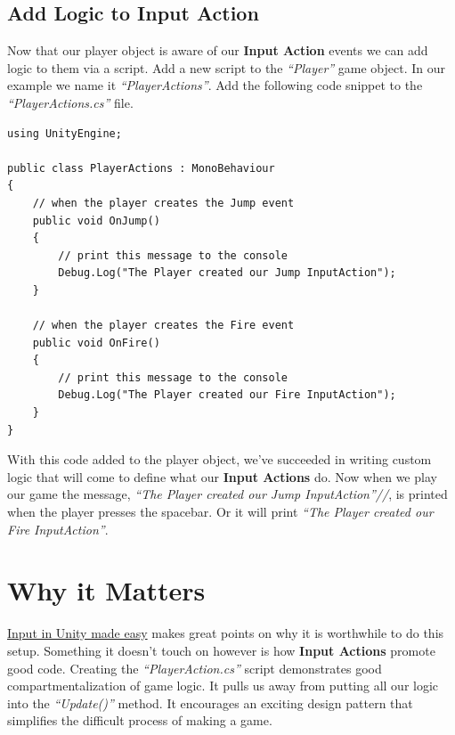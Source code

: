\documentclass[a4paper,11pt,twoside]{article}
\begin{document}
\subsection*{Add Logic to Input Action}
\label{sec:orgfc955dd}
Now that our player object is aware of our \textbf{Input Action} events we can add logic to them via a script. Add a new script to the \emph{``Player''} game object. In our example we name it \emph{``PlayerActions''}.
Add the following code snippet to the \emph{``PlayerActions.cs''} file.
\begin{verbatim}
using UnityEngine;

public class PlayerActions : MonoBehaviour
{
    // when the player creates the Jump event
    public void OnJump()
    {
        // print this message to the console
        Debug.Log("The Player created our Jump InputAction");
    }

    // when the player creates the Fire event
    public void OnFire()
    {
        // print this message to the console
        Debug.Log("The Player created our Fire InputAction");
    }
}
\end{verbatim}
With this code added to the player object, we've succeeded in writing custom logic that will come to define what our \textbf{Input Actions} do. Now when we play our game the message, \emph{``The Player created our Jump InputAction''//}, is printed when the player presses the spacebar. Or it will print \emph{``The Player created our Fire InputAction''}.
\section*{Why it Matters}
\label{sec:org6241bcb}
\href{https://gamedevbeginner.com/input-in-unity-made-easy-complete-guide-to-the-new-system/}{Input in Unity made easy} makes great points on why it is worthwhile to do this setup. Something it doesn't touch on however is how \textbf{Input Actions} promote good code. Creating the \emph{``PlayerAction.cs''} script demonstrates good compartmentalization of game logic. It pulls us away from putting all our logic into the \emph{``Update()''} method. It encourages an exciting design pattern that simplifies the difficult process of making a game.
\end{document}
